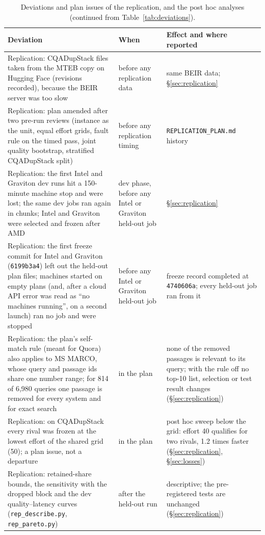\begin{table}[h]\centering\scriptsize
\caption{Deviations and plan issues of the replication, and the post hoc analyses (continued from Table~\ref{tab:deviations}).}\label{tab:deviations2}
\begin{tabularx}{\textwidth}{p{3.6cm}p{2.1cm}X}\toprule
Deviation & When & Effect and where reported\\\midrule
Replication: CQADupStack files taken from the MTEB copy on Hugging Face (revisions recorded), because the BEIR server was too slow & before any replication data & same BEIR data; \S\ref{sec:replication} \\
Replication: plan amended after two pre-run reviews (instance as the unit, equal effort grids, fault rule on the timed pass, joint quality bootstrap, stratified CQADupStack split) & before any replication timing & \texttt{REPLICATION\_PLAN.md} history \\
Replication: the first Intel and Graviton dev runs hit a 150-minute machine stop and were lost; the same dev jobs ran again in chunks; Intel and Graviton were selected and frozen after AMD & dev phase, before any Intel or Graviton held-out job & \S\ref{sec:replication} \\
Replication: the first freeze commit for Intel and Graviton (\texttt{6199b3a4}) left out the held-out plan files; machines started on empty plans (and, after a cloud API error was read as ``no machines running'', on a second launch) ran no job and were stopped & before any Intel or Graviton held-out job & freeze record completed at \texttt{4740606a}; every held-out job ran from it \\
Replication: the plan's self-match rule (meant for Quora) also applies to MS MARCO, whose query and passage ids share one number range; for 814 of 6,980 queries one passage is removed for every system and for exact search & in the plan & none of the removed passages is relevant to its query; with the rule off no top-10 list, selection or test result changes (\S\ref{sec:replication}) \\
Replication: on CQADupStack every rival was frozen at the lowest effort of the shared grid (50); a plan issue, not a departure & in the plan & post hoc sweep below the grid: effort 40 qualifies for two rivals, 1.2 times faster (\S\ref{sec:replication}, \S\ref{sec:losses}) \\
Replication: retained-share bounds, the sensitivity with the dropped block and the dev quality--latency curves (\texttt{rep\_describe.py}, \texttt{rep\_pareto.py}) & after the held-out run & descriptive; the pre-registered tests are unchanged (\S\ref{sec:replication}) \\

\end{tabularx}
\end{table}
